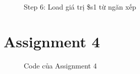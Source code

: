 \documentclass[a4paper,12pt]{article}
\begin{document}
\begin{figure}[!h]
	\centerline{}
	\caption*{Step 6: Load giá trị \$s1 từ ngăn xếp}
	\label{fig:ass3_6}
\end{figure}
\clearpage
\section{Assignment 4}
\begin{figure}[!h]
	\centerline{}
\end{figure}
\begin{figure}[!h]
	\centerline{}
	\caption{Code của Assignment 4}
\end{figure}
\end{document}
